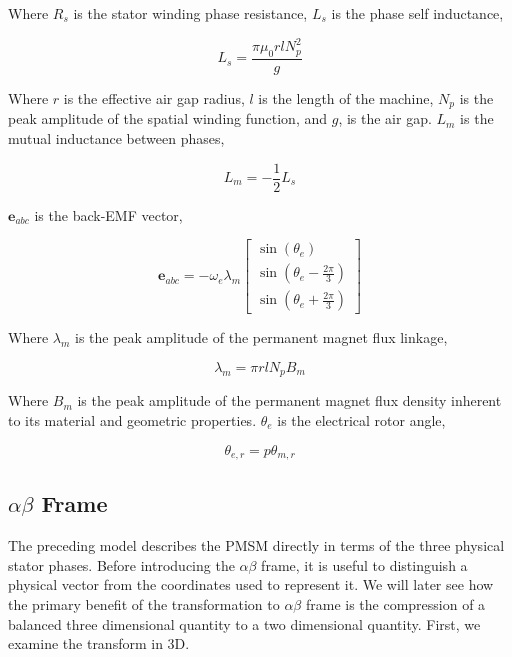 \documentclass{article}
\begin{document}
Where $R_s$ is the stator winding phase resistance, $L_s$ is the phase self inductance,

\begin{equation}
    L_{s} = \frac{\pi \mu_0 r l N_p^2}{g}
\end{equation}

Where $r$ is the effective air gap radius, $l$ is the length of the machine, $N_p$ is the peak amplitude of the spatial winding function, and $g$, is the air gap. $L_m$ is the mutual inductance between phases,

\begin{equation}
    L_m = -\frac{1}{2}L_s
\end{equation}

$\mathbf{e}_{abc}$ is the back-EMF vector,

\begin{equation}
    \boldsymbol{e}_{abc} = -\omega_e\lambda_m
    \begin{bmatrix}
        \sin(\theta_e) \\[4pt]
        \sin\left(\theta_e-\frac{2\pi}{3}\right) \\[4pt]
        \sin\left(\theta_e+\frac{2\pi}{3}\right)
    \end{bmatrix}
\end{equation}

Where $\lambda_m$ is the peak amplitude of the permanent magnet flux linkage,

\begin{equation}
    \lambda_m = \pi r l N_p B_m
\end{equation}

Where $B_m$ is the peak amplitude of the permanent magnet flux density inherent to its material and geometric properties. $\theta_e$ is the electrical rotor angle,

\begin{equation}
    \theta_{e,r} = p\theta_{m,r}
\end{equation}


\subsection{\texorpdfstring{$\alpha\beta$}{Alpha-Beta} Frame}
\label{sec:alpha-beta-frame}

The preceding model describes the PMSM directly in terms of the three physical stator phases. Before introducing the $\alpha\beta$ frame, it is useful to distinguish a physical vector from the coordinates used to represent it. We will later see how the primary benefit of the transformation to $\alpha\beta$ frame is the compression of a balanced three dimensional quantity to a two dimensional quantity. First, we examine the transform in 3D. 
\end{document}
